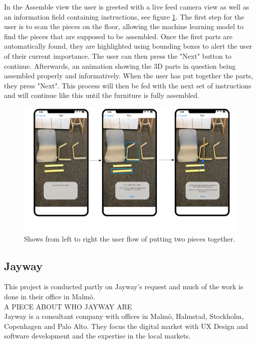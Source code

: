In the Assemble view the user is greeted with a live feed camera view as well as an information field containing instructions, see figure \ref{fig:assemble-view}. The first step for the user is to scan the pieces on the floor, allowing the machine learning model to find the pieces that are supposed to be assembled. Once the first parts are automatically found, they are highlighted using bounding boxes to alert the user of their current importance. The user can then press the "Next" button to continue. Afterwards, an animation showing the 3D parts in question being assembled properly and informatively. When the user has put together the parts, they press "Next". This process will then be fed with the next set of instructions and will continue like this until the furniture is fully assembled.
\begin{figure}[hbtp]
\begin{center}
\includegraphics[height = 0.4\textheight]{./Images/AR_Scene.png}
\caption{Shows from left to right the user flow of putting two pieces together.}
\label{fig:assemble-view}
\end{center}
\end{figure}

\newpage

\subsection{Jayway}
This project is conducted partly on Jayway's request and much of the work is done in their office in Malmö.\\

A PIECE ABOUT WHO JAYWAY ARE\\
Jayway is a consultant company with offices in Malmö, Halmstad, Stockholm, Copenhagen and Palo Alto. They focus the digital market with UX Design and software development and the expertise in the local markets. \\



